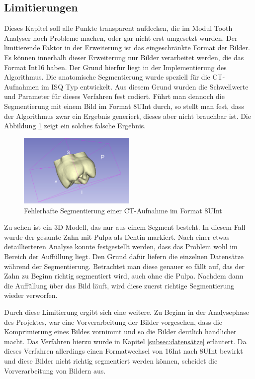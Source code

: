 \subsection{Limitierungen}
\label{sec:limitierungen} Dieses Kapitel soll alle Punkte transparent aufdecken,
die im Modul Tooth Analyser noch Probleme machen, oder gar nicht erst umgesetzt
wurden. Der limitierende Faktor in der Erweiterung ist das eingeschränkte Format
der Bilder. Es können innerhalb dieser Erweiterung nur Bilder verarbeitet werden,
die das Format \ac{Int16} haben. Der Grund hierfür liegt in der Implementierung des
Algorithmus. Die anatomische Segmentierung wurde speziell für die CT-Aufnahmen
im \ac{ISQ} Typ entwickelt. Aus diesem Grund wurden die Schwellwerte und
Parameter für dieses Verfahren fest codiert. Führt man dennoch die Segmentierung
mit einem Bild im Format \ac{8UInt} durch, so stellt man fest, dass der
Algorithmus zwar ein Ergebnis generiert, dieses aber nicht brauchbar ist. Die
Abbildung \ref{fig:3d_error} zeigt ein solches falsche Ergebnis.

\begin{figure}[h]
	\centering
	\includegraphics[width=0.5\textwidth]{img/3d_view_error.png}
	\caption{Fehlerhafte Segmentierung einer CT-Aufnahme im Format \ac{8UInt}}
	\label{fig:3d_error}
\end{figure}

Zu sehen ist ein 3D Modell, das nur aus einem Segment besteht. In diesem Fall wurde
der gesamte Zahn mit Pulpa als Dentin markiert. Nach einer etwas detaillierteren
Analyse konnte festgestellt werden, dass das Problem wohl im Bereich der Auffüllung
liegt. Den Grund dafür liefern die einzelnen Datensätze während der
Segmentierung. Betrachtet man diese genauer so fällt auf, das der Zahn zu Beginn
richtig segmentiert wird, auch ohne die Pulpa. Nachdem dann die Auffüllung über
das Bild läuft, wird diese zuerst richtige Segmentierung wieder verworfen.

Durch diese Limitierung ergibt sich eine weitere. Zu Beginn in der Analysephase
des Projektes, war eine Vorverarbeitung der Bilder vorgesehen, dass die
Komprimierung eines Bildes vornimmt und so die Bilder deutlich handlicher macht.
Das Verfahren hierzu wurde in Kapitel \ref{subsec:datensätze} erläutert. Da
dieses Verfahren allerdings einen Formatwechsel von \ac{16Int} nach \ac{8UInt}
bewirkt und diese Bilder nicht richtig segmentiert werden können, scheidet die Vorverarbeitung
von Bildern aus.

